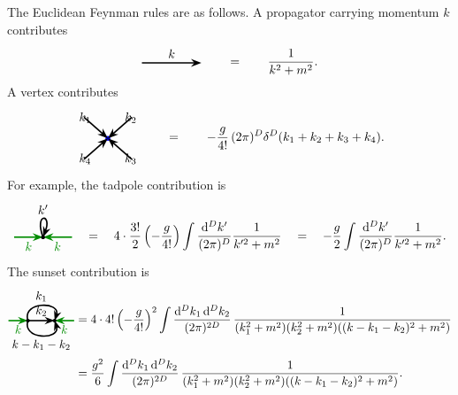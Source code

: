 The Euclidean Feynman rules are as follows. A propagator carrying momentum
\(k\) contributes
\[
\begin{tikzpicture}[baseline=-0.45ex, scale=0.85, >=Stealth]
  \draw[very thick, ->] (-1,0)--(1,0) node[midway, above] {$k$};
\end{tikzpicture}
\qquad =\qquad
\frac{1}{k^2+m^2}.
\]
A vertex contributes
\[
\begin{tikzpicture}[baseline=-0.45ex, scale=0.8, >=Stealth]
  \fill[blue] (0,0) circle (2.5pt);
  \draw[very thick, ->] (-0.85,0.75)--(0,0) node[midway, above left] {$k_1$};
  \draw[very thick, ->] (0.85,0.75)--(0,0) node[midway, above right] {$k_2$};
  \draw[very thick, ->] (0.85,-0.75)--(0,0) node[midway, below right] {$k_3$};
  \draw[very thick, ->] (-0.85,-0.75)--(0,0) node[midway, below left] {$k_4$};
\end{tikzpicture}
\qquad =\qquad
-\frac{g}{4!}\,(2\pi)^D
\delta^D(k_1+k_2+k_3+k_4).
\]
For example, the tadpole contribution is
\[
\begin{tikzpicture}[baseline=-0.45ex, scale=0.75, >=Stealth]
  \draw[green!55!black, very thick, ->] (-1.1,0)--(0,0) node[midway, below] {$k$};
  \draw[green!55!black, very thick, ->] (1.1,0)--(0,0) node[midway, below] {$k$};
  \fill (0,0) circle (2.2pt);
  \draw[very thick, ->] (0,0) .. controls (-0.35,0.9) and (0.35,0.9) .. (0,0)
    node[midway, above] {$k'$};
\end{tikzpicture}
\quad=\quad
4\cdot\frac{3!}{2}
\left(-\frac{g}{4!}\right)
\int\frac{\dd^D k'}{(2\pi)^D}\frac{1}{k'^2+m^2}
\quad=\quad
-\frac{g}{2}
\int\frac{\dd^D k'}{(2\pi)^D}\frac{1}{k'^2+m^2}.
\]
The sunset contribution is
\[
\begin{aligned}
\begin{tikzpicture}[baseline=-0.45ex, scale=0.72, >=Stealth]
  \draw[green!55!black, very thick, ->] (-1.35,0)--(-0.55,0) node[midway, below] {$k$};
  \draw[green!55!black, very thick, ->] (1.35,0)--(0.55,0) node[midway, below] {$k$};
  \fill (-0.55,0) circle (2.2pt);
  \fill (0.55,0) circle (2.2pt);
  \draw[very thick, ->] (-0.55,0) .. controls (-0.8,0.8) and (0.8,0.8) .. (0.55,0)
    node[midway, above] {$k_1$};
  \draw[very thick, ->] (-0.55,0)--(0.55,0) node[midway, above] {$k_2$};
  \draw[very thick, ->] (-0.55,0) .. controls (-0.8,-0.8) and (0.8,-0.8) .. (0.55,0)
    node[midway, below] {$k-k_1-k_2$};
\end{tikzpicture}
&=
4\cdot 4!
\left(-\frac{g}{4!}\right)^2
\int\frac{\dd^D k_1\,\dd^D k_2}{(2\pi)^{2D}}\,
\frac{1}{
  (k_1^2+m^2)(k_2^2+m^2)
  ((k-k_1-k_2)^2+m^2)
}  \\
&=
\frac{g^2}{6}
\int\frac{\dd^D k_1\,\dd^D k_2}{(2\pi)^{2D}}\,
\frac{1}{
  (k_1^2+m^2)(k_2^2+m^2)
  ((k-k_1-k_2)^2+m^2)
}.
\end{aligned}
\]

